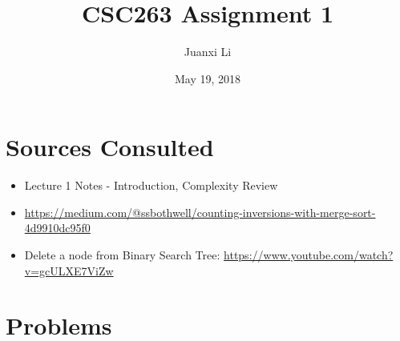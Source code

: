 \documentclass{article}
\title{CSC263 Assignment 1}
\author{Juanxi Li}
\date{May 19, 2018}
\begin{document}
\maketitle

\section*{Sources Consulted}

\begin{itemize}
    \item Lecture 1 Notes - Introduction, Complexity Review
    \item \url{https://medium.com/@ssbothwell/counting-inversions-with-merge-sort-4d9910dc95f0}{}
    \item Delete a node from Binary Search Tree: \url{https://www.youtube.com/watch?v=gcULXE7ViZw}

\end{itemize}

\section*{Problems}
\end{document}
